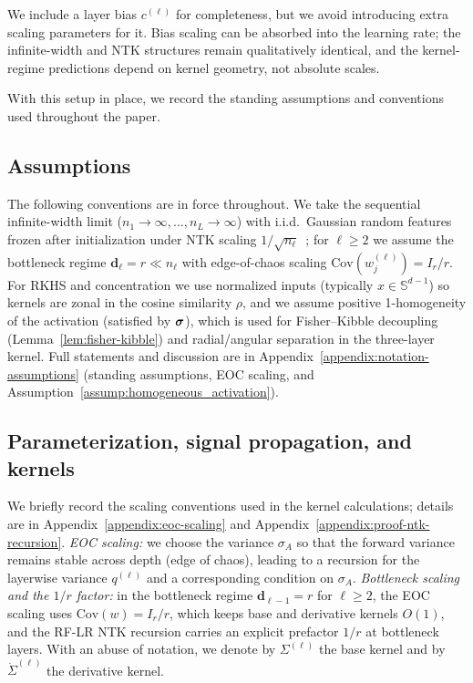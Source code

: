 We include a layer bias \(c^{(\ell)}\) for completeness, but we avoid introducing extra scaling parameters for it. Bias scaling can be absorbed into the learning rate; the infinite-width and NTK structures remain qualitatively identical, and the kernel-regime predictions depend on kernel geometry, not absolute scales.

With this setup in place, we record the standing assumptions and conventions used throughout the paper.

\subsection{Assumptions}\label{subsec:assumptions}
The following conventions are in force throughout. We take the sequential infinite-width limit (\(n_1\to\infty,\ldots,n_L\to\infty\)) with i.i.d.\ Gaussian random features frozen after initialization under NTK scaling \(1/\sqrt{n_\ell}\)~\cite{jacot2018neural}; for \(\ell\ge 2\) we assume the bottleneck regime \(\bm{d}_\ell=r\ll n_\ell\) with edge-of-chaos scaling \(\mathrm{Cov}(w^{(\ell)}_j)=I_r/r\). For RKHS and concentration we use normalized inputs (typically \(x\in\mathbb{S}^{d-1}\)) so kernels are zonal in the cosine similarity \(\rho\), and we assume positive 1-homogeneity of the activation (satisfied by \(\mathrel{\boldsymbol{\sigma}}\)), which is used for Fisher--Kibble decoupling (Lemma~\ref{lem:fisher-kibble}) and radial/angular separation in the three-layer kernel. Full statements and discussion are in Appendix~\ref{appendix:notation-assumptions} (standing assumptions, EOC scaling, and Assumption~\ref{assump:homogeneous_activation}).

\subsection{Parameterization, signal propagation, and kernels}
We briefly record the scaling conventions used in the kernel calculations; details are in Appendix~\ref{appendix:eoc-scaling} and Appendix~\ref{appendix:proof-ntk-recursion}. \emph{EOC scaling:} we choose the variance \(\sigma_A\) so that the forward variance remains stable across depth (edge of chaos), leading to a recursion for the layerwise variance \(q^{(\ell)}\) and a corresponding condition on \(\sigma_A\). \emph{Bottleneck scaling and the \(1/r\) factor:} in the bottleneck regime \(\bm{d}_{\ell-1}=r\) for \(\ell\ge 2\), the EOC scaling uses \( \mathrm{Cov}(w)=I_r/r \), which keeps base and derivative kernels \(O(1)\), and the RF-LR NTK recursion carries an explicit prefactor \(1/r\) at bottleneck layers. With an abuse of notation, we denote by \( \Sigma^{(\ell)} \) the base kernel and by \( \dot{\Sigma}^{(\ell)} \) the derivative kernel.

